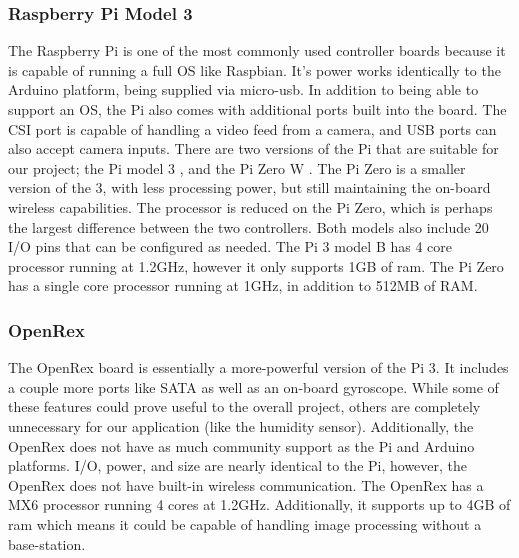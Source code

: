 \documentclass[onecolumn, draftclsnofoot,10pt, compsoc]{IEEEtran}
\begin{document}

\subsubsection{Raspberry Pi Model 3}

The Raspberry Pi is one of the most commonly used controller boards 
because it is capable of running a full OS like Raspbian. It's 
power works identically to the Arduino platform, being supplied via 
micro-usb. In addition to being able to support an OS, the Pi also 
comes with additional ports built into the board. The CSI port is 
capable of handling a video feed from a camera, and USB ports can 
also accept camera inputs. There are two versions of the Pi that 
are suitable for our project; the Pi model 3 \cite{r2}, and 
the Pi Zero W \cite{r3}. The Pi Zero is a smaller version of the 3, 
with less processing power, but still maintaining the on-board 
wireless capabilities. 
The processor is reduced on the Pi Zero, which is perhaps the 
largest difference between the two controllers. Both models also 
include 20 I/O pins that can be configured as needed. The Pi 3 
model B has 4 core processor running at 1.2GHz, however it only 
supports 1GB of ram. The Pi Zero has a single core processor 
running at 1GHz, in addition to 512MB of RAM.   




\subsubsection{OpenRex}


The OpenRex\cite{r4} board is essentially a more-powerful version 
of the Pi 3. It includes a couple more ports like SATA as well as 
an on-board gyroscope. 
While some of these features could prove useful to the 
overall project, others are completely unnecessary for our 
application (like the humidity sensor). Additionally, the OpenRex 
does not have as much community support as the Pi and Arduino 
platforms. I/O, power, and size are nearly identical to the Pi, 
however, the OpenRex does not have built-in wireless communication. 
The OpenRex has a MX6 processor running 4 cores at 1.2GHz. 
Additionally, it supports up to 4GB of ram which means it could be 
capable of handling image processing without a base-station.  
\end{document}

